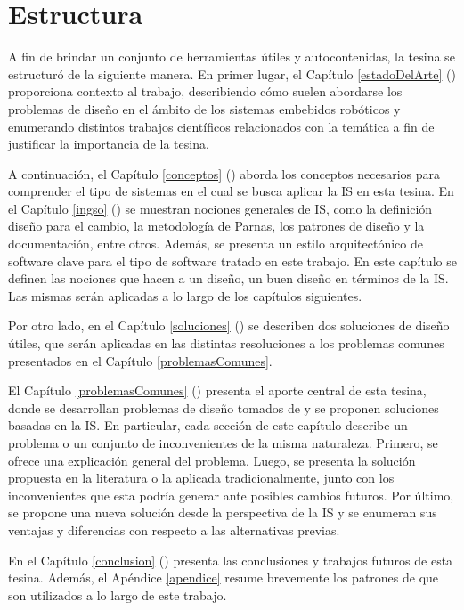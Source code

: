 \section*{Estructura}

A fin de brindar un conjunto de herramientas útiles y autocontenidas, la tesina se estructuró de la siguiente manera. En primer lugar, el Capítulo \ref{estadoDelArte} () proporciona contexto al trabajo, describiendo cómo suelen abordarse los problemas de diseño en el ámbito de los sistemas embebidos robóticos y enumerando distintos trabajos científicos relacionados con la temática a fin de justificar la importancia de la tesina.

A continuación, el Capítulo \ref{conceptos} () aborda los conceptos necesarios para comprender el tipo de sistemas en el cual se busca aplicar la \gls{IS} en esta tesina. En el Capítulo \ref{ingso} () se muestran nociones generales de \gls{IS}, como la definición diseño para el cambio, la metodología de Parnas, los patrones de diseño y la documentación, entre otros. Además, se presenta un estilo arquitectónico de software clave para el tipo de software tratado en este trabajo. En este capítulo se definen las nociones que hacen a un diseño, un buen diseño en términos de la \gls{IS}. Las mismas serán aplicadas a lo largo de los capítulos siguientes.

Por otro lado, en el Capítulo \ref{soluciones} () se describen dos soluciones de diseño útiles, que serán aplicadas en las distintas resoluciones a los problemas comunes presentados en el Capítulo \ref{problemasComunes}.

El Capítulo \ref{problemasComunes} () presenta el aporte central de esta tesina, donde se desarrollan problemas de diseño tomados de \cite{douglass} y se proponen soluciones basadas en la \gls{IS}. En particular, cada sección de este capítulo describe un problema o un conjunto de inconvenientes de la misma naturaleza. Primero, se ofrece una explicación general del problema. Luego, se presenta la solución propuesta en la literatura o la aplicada tradicionalmente, junto con los inconvenientes que esta podría generar ante posibles cambios futuros. Por último, se propone una nueva solución desde la perspectiva de la \gls{IS} y se enumeran sus ventajas y diferencias con respecto a las alternativas previas.

En el Capítulo \ref{conclusion} () presenta las conclusiones y trabajos futuros de esta tesina. Además, el Apéndice \ref{apendice} resume brevemente los patrones de \cite{Gamma:1995:DPE:186897} que son utilizados a lo largo de este trabajo.


